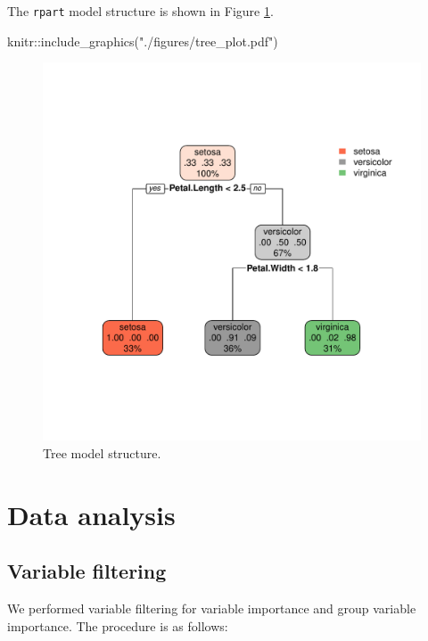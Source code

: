 \documentclass[
  11pt,
  oneside]{book}
\newenvironment{Shaded}{\begin{snugshade}}{\end{snugshade}}
\newcommand{\FunctionTok}[1]{\textcolor[rgb]{0.00,0.00,0.00}{#1}}
\newcommand{\NormalTok}[1]{#1}
\newcommand{\SpecialCharTok}[1]{\textcolor[rgb]{0.00,0.00,0.00}{#1}}
\newcommand{\StringTok}[1]{\textcolor[rgb]{0.31,0.60,0.02}{#1}}
\begin{document}
The \texttt{rpart} model structure is shown in Figure \ref{fig:treePlot}.

\begin{Shaded}
\begin{Highlighting}[]
\NormalTok{knitr}\SpecialCharTok{::}\FunctionTok{include\_graphics}\NormalTok{(}\StringTok{"./figures/tree\_plot.pdf"}\NormalTok{)}
\end{Highlighting}
\end{Shaded}

\begin{figure}
\centering
\includegraphics{./figures/tree_plot.pdf}
\caption{\label{fig:treePlot}Tree model structure.}
\end{figure}

\hypertarget{data-analysis}{%
\chapter{Data analysis}\label{data-analysis}}

\hypertarget{variable-filtering}{%
\section{Variable filtering}\label{variable-filtering}}

We performed variable filtering for variable importance and group variable importance. The procedure is as follows:
\end{document}
